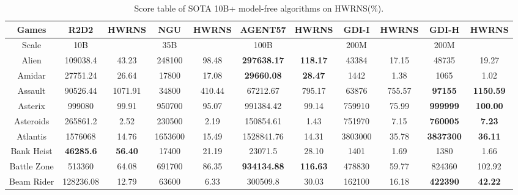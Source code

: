 \documentclass[nohyperref]{article}
\theoremstyle{plain}
\begin{document}
\begin{table}[!hb]
\footnotesize
\begin{center}
\caption{Score table of SOTA 10B+ model-free algorithms on HWRNS(\%).}
\label{Tab:Score table of SOTA 10B+ model-free algorithms on HWRNS.}
\setlength{\tabcolsep}{1.0pt}
\begin{tabular}{|c| c c| c c| c c| c c| c c| }
\hline
 Games & R2D2 & HWRNS & NGU & HWRNS & AGENT57 & HWRNS & GDI-I & HWRNS & GDI-H & HWRNS \\
\hline
Scale  & 10B   &        & 35B &         & 100B     &        & 200M &  &    200M   &\\
\hline
 Alien              & 109038.4          & 43.23       & 248100          & 98.48          & \textbf{297638.17}   &\textbf{118.17}         &43384             &17.15   &48735             &19.27    \\
 Amidar             & 27751.24          & 26.64       & 17800           & 17.08          & \textbf{29660.08}    &\textbf{28.47}          &1442              &1.38    &1065              &1.02    \\
 Assault            & 90526.44          & 1071.91     & 34800           & 410.44         & 67212.67             &795.17         &63876             &755.57  &\textbf{97155}             &\textbf{1150.59}    \\
 Asterix            & 999080   & 99.91       & 950700          & 95.07          & 991384.42            &99.14          &759910            &75.99   &\textbf{999999}            &\textbf{100.00}    \\
 Asteroids          & 265861.2          & 2.52        & 230500          & 2.19           & 150854.61            &1.43           &751970     &7.15    &\textbf{760005}            &\textbf{7.23}    \\
 Atlantis           & 1576068           & 14.76       & 1653600         & 15.49          & 1528841.76           &14.31          &3803000    &35.78   &\textbf{3837300}           &\textbf{36.11}    \\
 Bank Heist         & \textbf{46285.6}  & \textbf{56.40}       & 17400           & 21.19          & 23071.5              &28.10          &1401              &1.69    &1380              &1.66    \\
 Battle Zone        & 513360            & 64.08       & 691700          & 86.35          & \textbf{934134.88}   &\textbf{116.63}         &478830            &59.77   &824360            &102.92    \\
 Beam Rider         & 128236.08         & 12.79       & 63600           & 6.33           & 300509.8    &30.03          &162100            &16.18   &\textbf{422390}            &\textbf{42.22}    \\

\end{tabular}
\end{center}
\end{table}
\end{document}
